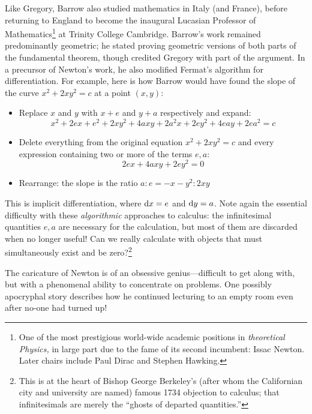  Like Gregory, Barrow also studied mathematics in Italy (and France), before returning to England to become the inaugural Lucasian Professor of Mathematics\footnote{%
	One of the most prestigious world-wide academic positions in \emph{theoretical Physics,} in large part due to the fame of its second incumbent: Issac Newton. Later chairs include Paul Dirac and Stephen Hawking.%
}
at Trinity College Cambridge. Barrow's work remained predominantly geometric; he stated proving geometric versions of both parts of the fundamental theorem, though credited Gregory with part of the argument. In a precursor of Newton's work, he also modified Fermat's algorithm for differentiation. For example, here is how Barrow would have found the slope of the curve $x^2+2xy^2=c$ at a point $(x,y)$:
\begin{itemize}\itemsep0pt
  \item Replace $x$ and $y$ with $x+e$ and $y+a$ respectively and expand:
  \[
  	x^2+2ex+e^2+2xy^2+4axy+2a^2x+2ey^2+4eay+2ea^2=c
  \]
  \item Delete everything from the original equation $x^2+2xy^2=c$ and every expression containing two or more of the terms $e,a$:
  \[
  	2ex+4axy+2ey^2=0
  \]
  \item Rearrange: the slope is the ratio $a:e=-x-y^2:2xy$
\end{itemize}
This is implicit differentiation, where ${\mathrm{d} x}=e$ and ${\mathrm{d} y}=a$. Note again the essential difficulty with these \emph{algorithmic} approaches to calculus: the infinitesimal quantities $e,a$ are necessary for the calculation, but most of them are discarded when no longer useful! Can we really calculate with objects that must simultaneously exist and be zero?\footnote{This is at the heart of Bishop George Berkeley's (after whom the Californian city and university are named) famous 1734 objection to calculus; that infinitesimals are merely the ``ghosts of departed quantities.''}


% 





The caricature of Newton is of an obsessive genius---difficult to get along with, but with a phenomenal ability to concentrate on problems. One possibly apocryphal story describes how he continued lecturing to an empty room even after no-one had turned up!\par

